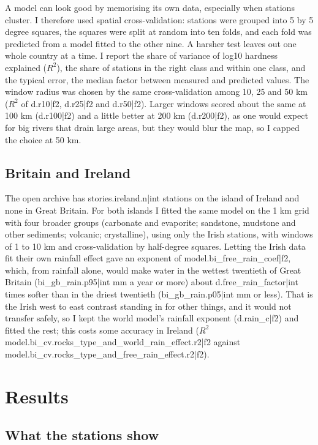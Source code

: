 \documentclass[11pt,a4paper]{article}
\begin{document}
A model can look good by memorising its own data, especially when stations cluster. I therefore used spatial cross-validation: stations were grouped into 5 by 5 degree squares, the squares were split at random into ten folds, and each fold was predicted from a model fitted to the other nine. A harsher test leaves out one whole country at a time. I report the share of variance of log10 hardness explained ($R^2$), the share of stations in the right class and within one class, and the typical error, the median factor between measured and predicted values. The window radius was chosen by the same cross-validation among 10, 25 and 50 km ($R^2$ of {{d.r10|f2}}, {{d.r25|f2}} and {{d.r50|f2}}). Larger windows scored about the same at 100 km ({{d.r100|f2}}) and a little better at 200 km ({{d.r200|f2}}), as one would expect for big rivers that drain large areas, but they would blur the map, so I capped the choice at 50 km.

\subsection{Britain and Ireland}

The open archive has {{stories.ireland.n|int}} stations on the island of Ireland and none in Great Britain. For both islands I fitted the same model on the 1 km grid with four broader groups (carbonate and evaporite; sandstone, mudstone and other sediments; volcanic; crystalline), using only the Irish stations, with windows of 1 to 10 km and cross-validation by half-degree squares. Letting the Irish data fit their own rainfall effect gave an exponent of {{model.bi_free_rain_coef|f2}}, which, from rainfall alone, would make water in the wettest twentieth of Great Britain ({{bi_gb_rain.p95|int}} mm a year or more) about {{d.free_rain_factor|int}} times softer than in the driest twentieth ({{bi_gb_rain.p05|int}} mm or less). That is the Irish west to east contrast standing in for other things, and it would not transfer safely, so I kept the world model's rainfall exponent ({{d.rain_c|f2}}) and fitted the rest; this costs some accuracy in Ireland ($R^2$ {{model.bi_cv.rocks_type_and_world_rain_effect.r2|f2}} against {{model.bi_cv.rocks_type_and_free_rain_effect.r2|f2}}).

\section{Results}

\subsection{What the stations show}
\end{document}
